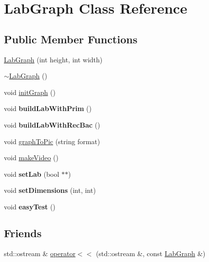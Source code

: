 \hypertarget{class_lab_graph}{\section{Lab\-Graph Class Reference}
\label{class_lab_graph}
}
\subsection*{Public Member Functions}
\begin{DoxyCompactItemize}
\item 
\hyperlink{class_lab_graph_aa10dea2f824ce99b6175952650ea7349}{Lab\-Graph} (int height, int width)
\item 
\hyperlink{class_lab_graph_ac37389ef1300ceb90c81fc482971471f}{$\sim$\-Lab\-Graph} ()
\item 
void \hyperlink{class_lab_graph_ab54dc4e91349cfeca4e501ab7bd340af}{init\-Graph} ()
\item 
\hypertarget{class_lab_graph_ab9767076b66b28dae3c47b9c3177b498}{void {\bfseries build\-Lab\-With\-Prim} ()}\label{class_lab_graph_ab9767076b66b28dae3c47b9c3177b498}

\item 
\hypertarget{class_lab_graph_a04d781d9fe079eef7374babe6318c498}{void {\bfseries build\-Lab\-With\-Rec\-Bac} ()}\label{class_lab_graph_a04d781d9fe079eef7374babe6318c498}

\item 
void \hyperlink{class_lab_graph_a478f4acb3c4da8d81b079d26d83c9f42}{graph\-To\-Pic} (string format)
\item 
void \hyperlink{class_lab_graph_afca83817aa9ca4996f49fbd2dd2618f5}{make\-Video} ()
\item 
\hypertarget{class_lab_graph_a1b88384d6363809ae16384205ecff4e2}{void {\bfseries set\-Lab} (bool $\ast$$\ast$)}\label{class_lab_graph_a1b88384d6363809ae16384205ecff4e2}

\item 
\hypertarget{class_lab_graph_a44653d0495a05c3ba03e661d342b15e7}{void {\bfseries set\-Dimensions} (int, int)}\label{class_lab_graph_a44653d0495a05c3ba03e661d342b15e7}

\item 
\hypertarget{class_lab_graph_a5a9e4661d1b03a3de1e7b669ba9aa8e5}{void {\bfseries easy\-Test} ()}\label{class_lab_graph_a5a9e4661d1b03a3de1e7b669ba9aa8e5}

\end{DoxyCompactItemize}
\subsection*{Friends}
\begin{DoxyCompactItemize}
\item 
std\-::ostream \& \hyperlink{class_lab_graph_a98ed4ce18d06e538a4ef79d43997a19f}{operator$<$$<$} (std\-::ostream \&, const \hyperlink{class_lab_graph}{Lab\-Graph} \&)
\end{DoxyCompactItemize}



